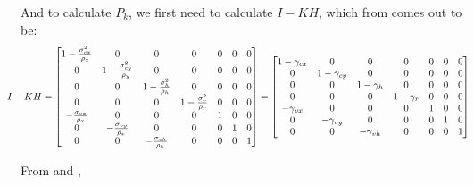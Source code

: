 \documentclass[10pt]{article}
\begin{document}
    \noindent And to calculate \(P_k\), we first need to calculate \(I - KH\), which from  comes out to be:
    \begin{equation} \hspace{-0.5cm}
        I - KH = \begin{bmatrix}
            1 - \frac{\sigma^2_{cx}}{\rho_x} & 0 & 0 & 0 & 0 & 0 & 0 \\
            0 & 1 - \frac{\sigma^2_{cy}}{\rho_y} & 0 & 0 & 0 & 0 & 0 \\
            0 & 0 & 1 - \frac{\sigma^2_h}{\rho_h} & 0 & 0 & 0 & 0 \\
            0 & 0 & 0 & 1 - \frac{\sigma^2_r}{\rho_r} & 0 & 0 & 0 \\
            -\frac{\sigma_{vx}}{\rho_x} & 0 & 0 & 0 & 1 & 0 & 0 \\
            0 & -\frac{\sigma_{vy}}{\rho_x} & 0 & 0 & 0 & 1 & 0 \\
            0 & 0 & -\frac{\sigma_{vh}}{\rho_h} & 0 & 0 & 0 & 1 
        \end{bmatrix} = \begin{bmatrix}
            1 - \gamma_{cx} & 0 & 0 & 0 & 0 & 0 & 0 \\
            0 & 1 - \gamma_{cy} & 0 & 0 & 0 & 0 & 0 \\
            0 & 0 & 1 - \gamma_h & 0 & 0 & 0 & 0 \\
            0 & 0 & 0 & 1 - \gamma_r & 0 & 0 & 0 \\
            -\gamma_{vx} & 0 & 0 & 0 & 1 & 0 & 0 \\
            0 & -\gamma_{vy} & 0 & 0 & 0 & 1 & 0 \\
            0 & 0 & -\gamma_{vh} & 0 & 0 & 0 & 1
        \end{bmatrix}
        \label{Eq:I-KH}
    \end{equation}

    \noindent From  and , 
    
\end{document}
